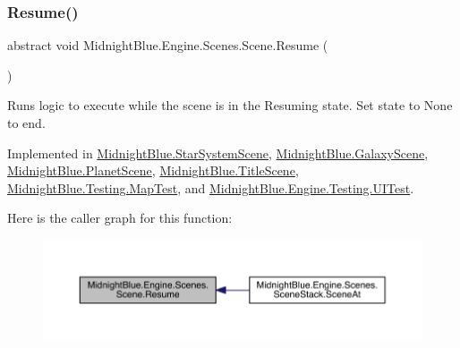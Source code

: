 \subsubsection{\texorpdfstring{Resume()}{Resume()}}
{\footnotesize\ttfamily abstract void Midnight\+Blue.\+Engine.\+Scenes.\+Scene.\+Resume (\begin{DoxyParamCaption}{ }\end{DoxyParamCaption})\hspace{0.3cm}{\ttfamily [pure virtual]}}



Runs logic to execute while the scene is in the Resuming state. Set state to None to end. 



Implemented in \hyperlink{class_midnight_blue_1_1_star_system_scene_aefbf0750a7ce153b923bcabb132e4875}{Midnight\+Blue.\+Star\+System\+Scene}, \hyperlink{class_midnight_blue_1_1_galaxy_scene_ab641e6727cdb64dc6487e9a229521692}{Midnight\+Blue.\+Galaxy\+Scene}, \hyperlink{class_midnight_blue_1_1_planet_scene_aa14750d3675b59462796e821b3921397}{Midnight\+Blue.\+Planet\+Scene}, \hyperlink{class_midnight_blue_1_1_title_scene_afb0bb3ad8b2766b5d57537dc1ef22249}{Midnight\+Blue.\+Title\+Scene}, \hyperlink{class_midnight_blue_1_1_testing_1_1_map_test_aa595402e6d3702119877721f7cb3ab9f}{Midnight\+Blue.\+Testing.\+Map\+Test}, and \hyperlink{class_midnight_blue_1_1_engine_1_1_testing_1_1_u_i_test_a0c0ac7a8acf10482982ee63756605f61}{Midnight\+Blue.\+Engine.\+Testing.\+U\+I\+Test}.

Here is the caller graph for this function\+:
\nopagebreak
\begin{figure}[H]
\begin{center}
\leavevmode
\includegraphics[width=350pt]{class_midnight_blue_1_1_engine_1_1_scenes_1_1_scene_ab7cd837b20785116007a4732d90bc548_icgraph}
\end{center}
\end{figure}
\hypertarget{class_midnight_blue_1_1_engine_1_1_scenes_1_1_scene_a4e37ff3d5362a8ad5c0d82d7c990dfdf}{}\label{class_midnight_blue_1_1_engine_1_1_scenes_1_1_scene_a4e37ff3d5362a8ad5c0d82d7c990dfdf} 
